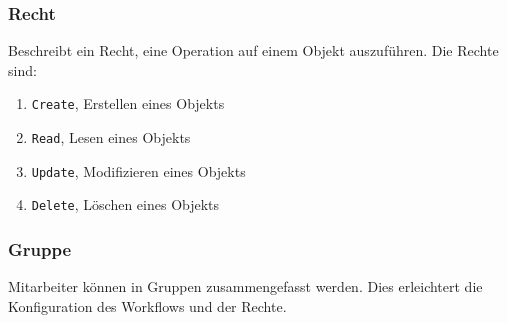 \subsubsection{Recht}\label{model:recht}

Beschreibt ein Recht, eine Operation auf einem Objekt auszuführen. Die Rechte sind:

\begin{enumerate}\itemsep -5pt
\item \texttt{Create}, Erstellen eines Objekts
\item \texttt{Read}, Lesen eines Objekts
\item \texttt{Update}, Modifizieren eines Objekts
\item \texttt{Delete}, Löschen eines Objekts
\end{enumerate}

\subsubsection{Gruppe}\label{model:gruppe}

Mitarbeiter können in Gruppen zusammengefasst werden. Dies erleichtert die Konfiguration des Workflows und der Rechte.